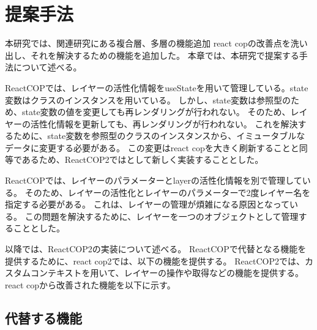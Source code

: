 \documentclass{jsarticle}
\begin{document}
\fi
\section{提案手法}
本研究では、関連研究にある複合層、多層の機能追加
react copの改善点を洗い出し、それを解決するための機能を追加した。
本章では、本研究で提案する手法について述べる。

ReactCOPでは、レイヤーの活性化情報をuseStateを用いて管理している。state変数はクラスのインスタンスを用いている。
しかし、state変数は参照型のため、state変数の値を変更しても再レンダリングが行われない。
そのため、レイヤーの活性化情報を更新しても、再レンダリングが行われない。
これを解決するために、state変数を参照型のクラスのインスタンスから、イミュータブルなデータに変更する必要がある。
この変更はreact copを大きく刷新することと同等であるため、ReactCOP2ではとして新しく実装することとした。

ReactCOPでは、レイヤーのパラメーターとlayerの活性化情報を別で管理している。
そのため、レイヤーの活性化とレイヤーのパラメーターで2度レイヤー名を指定する必要がある。
これは、レイヤーの管理が煩雑になる原因となっている。
この問題を解決するために、レイヤーを一つのオブジェクトとして管理することとした。

以降では、ReactCOP2の実装について述べる。
ReactCOPで代替となる機能を提供するために、react cop2では、以下の機能を提供する。
ReactCOP2では、カスタムコンテキストを用いて、レイヤーの操作や取得などの機能を提供する。
react copから改善された機能を以下に示す。



\subsection{代替する機能}
\end{document}
